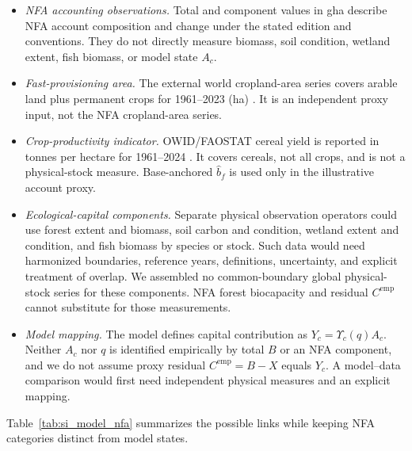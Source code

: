 \documentclass[11pt,a4paper]{article}
\newcommand{\Ups}{\Upsilon_c}
\begin{document}
\begin{itemize}[leftmargin=1.5em]
\item \emph{NFA accounting observations.} Total and component values in gha describe NFA account composition and change under the stated edition and conventions. They do not directly measure biomass, soil condition, wetland extent, fish biomass, or model state $A_c$.
\item \emph{Fast-provisioning area.} The external world cropland-area series covers arable land plus permanent crops for 1961--2023 (ha) \citep{OWIDCropland2026}. It is an independent proxy input, not the NFA cropland-area series.
\item \emph{Crop-productivity indicator.} OWID/FAOSTAT cereal yield is reported in tonnes per hectare for 1961--2024 \citep{OWIDCereal2026}. It covers cereals, not all crops, and is not a physical-stock measure. Base-anchored $\hat b_f$ is used only in the illustrative account proxy.
\item \emph{Ecological-capital components.} Separate physical observation operators could use forest extent and biomass, soil carbon and condition, wetland extent and condition, and fish biomass by species or stock. Such data would need harmonized boundaries, reference years, definitions, uncertainty, and explicit treatment of overlap. We assembled no common-boundary global physical-stock series for these components. NFA forest biocapacity and residual $C^{\mathrm{emp}}$ cannot substitute for those measurements.
\item \emph{Model mapping.} The model defines capital contribution as $Y_c=\Ups(q)A_c$. Neither $A_c$ nor $q$ is identified empirically by total $B$ or an NFA component, and we do not assume proxy residual $C^{\mathrm{emp}}=B-X$ equals $Y_c$. A model--data comparison would first need independent physical measures and an explicit mapping.
\end{itemize}

Table~\ref{tab:si_model_nfa} summarizes the possible links while keeping NFA categories distinct from model states.
\end{document}
